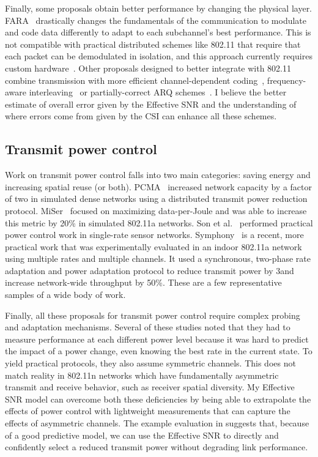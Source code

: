 Finally, some proposals obtain better performance by changing the physical layer. FARA~\cite{Rahul_FARA} drastically changes the fundamentals of the communication to modulate and code data differently to adapt to each subchannel's best performance. This is not compatible with practical distributed schemes like 802.11 that require that each packet can be demodulated in isolation, and this approach currently requires custom hardware~\cite{Rahul_SWIFT}. Other proposals designed to better integrate with 802.11 combine transmission with more efficient channel-dependent coding~\cite{Lin_ZipTX}, frequency-aware interleaving~\cite{Bhartia_FreqDiv} or partially-correct ARQ schemes~\cite{Jamieson_PPR}. I believe the better estimate of overall error given by the Effective SNR and the understanding of where errors come from given by the CSI can enhance all these schemes.

\subsection{Transmit power control}
Work on transmit power control falls into two main categories: saving energy and increasing spatial reuse (or both). PCMA~\cite{Monks_PowerMAC} increased network capacity by a factor of two in simulated dense networks using a distributed transmit power reduction protocol. MiSer~\cite{Qiao_MiSer} focused on maximizing data-per-Joule and was able to increase this metric by 20\% in simulated 802.11a networks. Son et al.~\cite{Son_PowerStudy} performed practical power control work in single-rate sensor networks. Symphony~\cite{Ramachandran_Symphony} is a recent, more practical work that was experimentally evaluated in an indoor 802.11a network using multiple rates and multiple channels. It used a synchronous, two-phase rate adaptation and power adaptation protocol to reduce transmit power by 3\dB and increase network-wide throughput by 50\%. These are a few representative samples of a wide body of work.

Finally, all these proposals for transmit power control require complex probing and adaptation mechanisms. Several of these studies noted that they had to measure performance at each different power level because it was hard to predict the impact of a power change, even knowing the best rate in the current state. To yield practical protocols, they also assume symmetric channels. This does not match reality in 802.11n networks which have fundamentally asymmetric transmit and receive behavior, such as receiver spatial diversity. My Effective SNR model can overcome both these deficiencies by being able to extrapolate the effects of power control with lightweight measurements that can capture the effects of asymmetric channels. The example evaluation in  suggests that, because of a good predictive model, we can use the Effective SNR to directly and confidently select a reduced transmit power without degrading link performance.

